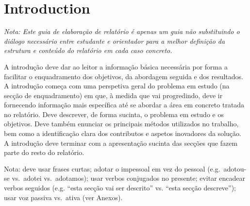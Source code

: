 \renewcommand{\thepage}{\arabic{page}}


\chapter{Introduction} %
\label{chap:intro}
\textit{Nota: 	Este guia de elaboração de relatório é apenas um guia não substituindo o diálogo necessário entre estudante e orientador para a melhor definição da estrutura e conteúdo do relatório em cada caso concreto.}

\vspace{2cm}

A introdução deve dar ao leitor a informação básica necessária por forma a facilitar o enquadramento dos objetivos, da abordagem seguida e dos resultados. A introdução começa com uma perspetiva geral do problema em estudo (na secção de enquadramento) em que, à medida que vai progredindo, deve ir fornecendo informação mais específica até se abordar a área em concreto tratada no relatório. Deve descrever, de forma sucinta, o problema em estudo e os objetivos. Deve também enunciar os principais métodos utilizados no trabalho, bem como a identificação clara dos contributos e aspetos inovadores da solução. A introdução deve terminar com a apresentação sucinta das secções que fazem parte do resto do relatório.


Nota: deve usar frases curtas; adotar o impessoal em vez do pessoal (e.g.\ adotou-se vs.\ adotei vs.\ adotamos); usar verbos conjugados no presente; evitar encadear verbos seguidos (e.g. “esta secção vai ser descrito” vs. “esta secção descreve”); usar voz passiva vs.\ ativa (ver Anexos).






